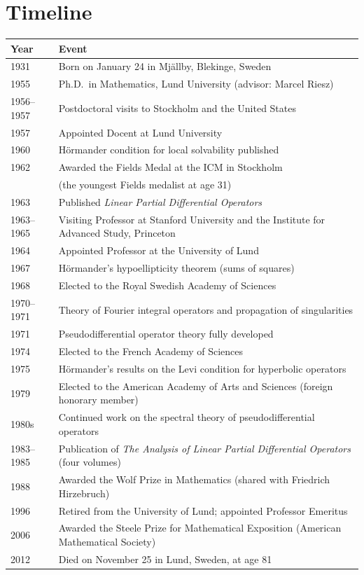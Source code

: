 \section*{Timeline}
\begin{tabularx}{\linewidth}{|p{1.5cm}|>{\raggedright\arraybackslash}X|}
\hline
\textbf{Year} & \textbf{Event} \\ \hline
1931 & Born on January 24 in Mj\"allby, Blekinge, Sweden \\ \hline
1955 & Ph.D.\ in Mathematics, Lund University (advisor: Marcel Riesz) \\ \hline
1956--1957 & Postdoctoral visits to Stockholm and the United States \\
\hline
1957 & Appointed Docent at Lund University \\ \hline
1960 & H\"ormander condition for local solvability published \\
\hline
1962 & Awarded the Fields Medal at the ICM in Stockholm \\
& (the youngest Fields medalist at age 31) \\ \hline
1963 & Published \textit{Linear Partial Differential Operators} \\
\hline
1963--1965 & Visiting Professor at Stanford University and the Institute
for Advanced Study, Princeton \\ \hline
1964 & Appointed Professor at the University of Lund \\ \hline
1967 & H\"ormander's hypoellipticity theorem (sums of squares) \\
\hline
1968 & Elected to the Royal Swedish Academy of Sciences \\ \hline
1970--1971 & Theory of Fourier integral operators and propagation
of singularities \\ \hline
1971 & Pseudodifferential operator theory fully developed \\ \hline
1974 & Elected to the French Academy of Sciences \\ \hline
1975 & H\"ormander's results on the Levi condition for hyperbolic
operators \\ \hline
1979 & Elected to the American Academy of Arts and Sciences
(foreign honorary member) \\ \hline
1980s & Continued work on the spectral theory of pseudodifferential
operators \\ \hline
1983--1985 & Publication of \textit{The Analysis of Linear Partial
Differential Operators} (four volumes) \\
\hline
1988 & Awarded the Wolf Prize in Mathematics (shared with
Friedrich Hirzebruch) \\ \hline
1996 & Retired from the University of Lund; appointed Professor
Emeritus \\ \hline
2006 & Awarded the Steele Prize for Mathematical Exposition
(American Mathematical Society) \\ \hline
2012 & Died on November 25 in Lund, Sweden, at age 81 \\ \hline
\end{tabularx}

